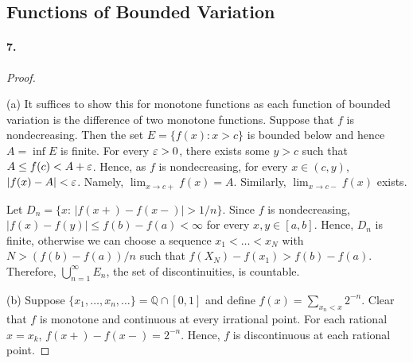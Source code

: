 \subsection{Functions of Bounded Variation}
  \paragraph{7.}
  \begin{proof}
    $\,$\par
    (a) It suffices to show this for monotone functions as each function of 
    bounded variation is the difference of two monotone functions. Suppose that
    $f$ is nondecreasing. Then the set $E=\{f(x):x>c\}$ is bounded below and 
    hence $A=\inf E$ is finite. For every $\varepsilon>0$, there exists some $y>c$ such 
    that $A\le f(c) <A+\varepsilon$. Hence, as $f$ is nondecreasing, for every $x\in(c,
    y)$, $|f(x)-A|<\varepsilon$. Namely, $\lim_{x\to c+}f(x)=A$. Similarly, $\lim_{x\to
    c-}f(x)$ exists.\par
    Let $D_n=\{x:\, |f(x+)-f(x-)|>1/n\}$. Since $f$ is nondecreasing, $|f(x)-
    f(y)|\le f(b)-f(a)<\infty$ for every $x,y\in[a,b]$. Hence, $D_n$ is finite,
    otherwise we can choose a sequence $x_1<\dots<x_N$ with $N>(f(b)-f(a))/n$
    such that $f(X_N)-f(x_1)> f(b)-f(a)$. Therefore, $\bigcup_{n=1}^\infty E_n$,
    the set of discontinuities, is countable.\par
    (b) Suppose $\{x_1,\dots,x_n,\dots\}=\mathbb{Q}\cap[0,1]$ and define $f(x)=
    \sum_{x_n<x}2^{-n}$. Clear that $f$ is monotone and continuous at every 
    irrational point. For each rational $x=x_k$, $f(x+)-f(x-)=2^{-n}$. Hence,
    $f$ is discontinuous at each rational point.
  \end{proof}

